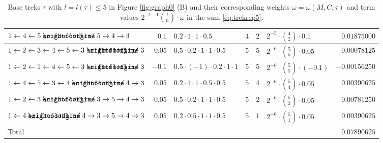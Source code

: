 \documentclass[10pt,twoside,a4paper]{amsart}
\DeclareRobustCommand{\unEdge}{%
	\mathrel{%
		\text{%
			\ooalign{$\rightfootline$\cr\reflectbox{$\rightfootline$}\cr}%
		}%
	}%
}
\begin{document}
\begin{ex}
\begin{table}[h]
{\begin{tabular}{lrlcclr}
        $1 \leftarrow 4 \leftarrow 5 \unEdge 5 \rightarrow 4 \rightarrow 3$ & 
        $0.1$ & $0.2 \cdot 1 \cdot 1 \cdot 0.5$ & 
        $4$ & $2$ & $2^{-5} \cdot {4 \choose 2} \cdot 0.1$ & $0.01875000$  \\

        \hline
        
        $1 \leftarrow 2 \leftarrow 3 \leftarrow 4 \leftarrow 5 \leftarrow 
        3 \unEdge 3$ & 
        $0.05$ & $0.5 \cdot 0.2 \cdot 1 \cdot 1 \cdot 0.5$ & 
        $5$ & $5$ & $2^{-6} \cdot {5 \choose 5} \cdot 0.05$ & $0.00078125$  \\

        $1 \leftarrow 2 \leftarrow 1 \leftarrow 4 \leftarrow 5 \leftarrow 
        3 \unEdge 3$ & 
        $-0.1$ & $0.5 \cdot (-1) \cdot 0.2 \cdot 1 \cdot 1$ & 
        $5$ & $5$ & $2^{-6} \cdot {5 \choose 5} \cdot (-0.1)$ & $-0.00156250$  \\
        
        $1 \leftarrow 4 \leftarrow 5 \leftarrow 3 \leftarrow 4 \unEdge 4 \rightarrow 3$ & 
        $0.05$ & $0.2 \cdot 1 \cdot 1 \cdot 0.5 \cdot 0.5$ & 
        $5$ & $4$ & $2^{-6} \cdot {5 \choose 4} \cdot 0.05$ & $0.00390625$  \\

        $1 \leftarrow 2 \leftarrow 3 \unEdge 3 \rightarrow 5 \rightarrow 4 \rightarrow 3$ & 
        $0.05$ & $0.5 \cdot 0.2 \cdot 1 \cdot 1 \cdot 0.5$ & 
        $5$ & $2$ & $2^{-6} \cdot {5 \choose 2} \cdot 0.05$ & $0.00781250$  \\
        
        $1 \leftarrow 4 \unEdge 4 \rightarrow 3 \rightarrow 5 \rightarrow 4 
        \rightarrow 3$ & 
        $0.05$ & $0.2 \cdot 0.5 \cdot 1 \cdot 1 \cdot 0.5$ & 
        $5$ & $1$ & $2^{-6} \cdot {5 \choose 1} \cdot 0.05$ & $0.00390625$  \\
        \hline \hline 
        Total & & & & & & $0.07890625$ \\
    \end{tabular}
    }
    \caption{Base treks $\tau$ with $l = l(\tau) \leq 5$ in Figure \ref{fig:graph0} (B)
    and their corresponding weights $\omega = \omega(M, C, \tau)$ and term values
    $2^{-l - 1} {l \choose n} \cdot \omega$ in the sum \eqref{eq:trekrep5}.
    \label{tab:treks}}
\end{table}

\setlength{\tabcolsep}{6pt} %
\renewcommand{\arraystretch}{1} 


\end{ex}
\end{document}
